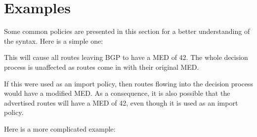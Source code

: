 \section{Examples}
Some common policies are presented in this section for a better understanding of
the syntax.  Here is a simple one:

\noindent{}

This will cause all routes leaving BGP to have a MED of 42.  The whole decision
process is unaffected as routes come in with their original MED.  

If this were used as an import policy, then routes flowing into the decision
process would have a modified MED.  As a consequence, it is also possible that
the advertised routes will have a MED of 42, even though it is used as an import
policy.

Here is a more complicated example:

